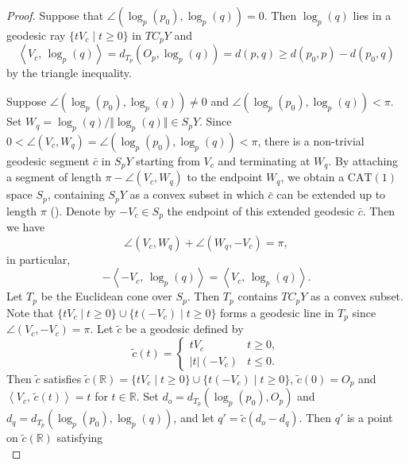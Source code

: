 \documentclass[12pt]{amsart}
\numberwithin{equation}{section}
\theoremstyle{plain}
\theoremstyle{definition}
\theoremstyle{remark}
\newcommand{\R}{{\mathbb R}}
\newcommand{\tcprj}{\log}
\newcommand{\inner}[2]{\left\langle #1,\, #2 \right\rangle}
\newcommand{\cat}[1]{\mathrm{CAT}(#1)}
\begin{document}
\begin{proof}
 Suppose that $\angle (\tcprj_p(p_0),\tcprj_p(q))=0$. 
 Then $\tcprj_p(q)$ lies in a geodesic ray $\{tV_c\mid t\geq 0\}$ in
 $TC_pY$ and 
 \begin{equation*}
   \inner{V_c}{\tcprj_p(q)} = d_{T_p}(O_p,\tcprj_p(q))
   = d(p,q) \geq d(p_0,p)-d(p_0,q)
 \end{equation*}
 by the triangle inequality.  

 Suppose $\angle (\tcprj_p(p_0),\tcprj_p(q))\not=0$ and 
 $\angle (\tcprj_p(p_0),\tcprj_p(q))< \pi$. 
 Set  $W_q = \tcprj_p(q)/\Vert \tcprj_p(q) \Vert \in S_pY$. 
 Since $0< \angle (V_c, W_q) =\angle (\tcprj_p(p_0),\tcprj_p(q)) < \pi$, 
 there is a non-trivial geodesic segment $\bar c$ in $S_pY$ starting
 from $V_c$ and terminating at $W_q$.
 By attaching a segment of length $\pi-\angle (V_c, W_q)$ to the
 endpoint $W_q$, we obtain a $\cat{1}$ space $S_p$, containing
 $S_pY$ as a convex subset in which $\bar c$ can be extended up to
 length $\pi$
 (\cite[p.~347, 11.1 Basic Glueing Theorem]{bridson-haefliger}). 
  Denote by $-V_c \in S_p$ the endpoint of this extended
 geodesic $\bar c$.  Then we have
 \begin{equation*}
  \angle(V_c, W_q) + \angle(W_q,-V_c) = \pi, 
 \end{equation*}
 in particular, 
 \begin{equation}
 \label{eq:minus_vector}
  -\inner{-V_c}{\tcprj_p(q)} %
  = \inner{V_c}{\tcprj_p(q)}. 
 \end{equation}
 Let $T_p$ be the Euclidean cone over $S_p$.  
 Then $T_p$ contains $TC_pY$ as a convex subset. 
 Note that $\{tV_c\mid t\geq 0\} \cup \{t(-V_c) \mid t\geq 0\}$
 forms a geodesic line in $T_p$ since $\angle(V_c,-V_c)=\pi$. 
 Let $\tilde c$ be a geodesic defined by
\begin{equation*}
 \tilde c (t)=
 \begin{cases}
  tV_c & t\geq 0, \\
  \vert t \vert (-V_c) & t \leq 0. 
 \end{cases}
\end{equation*}
 Then $\tilde c$ satisfies
 $\tilde c(\R) = \{tV_c\mid t\geq 0\} \cup \{t(-V_c) \mid t\geq 0\}$, 
 $\tilde c(0)=O_p$ and $\inner{V_c}{\tilde c(t)} = t$ for
 $t \in \R$. 
 Set $d_o=d_{T_p}(\tcprj_p(p_0),O_p)$ and 
 $d_q=d_{T_p}(\tcprj_p(p_0),\tcprj_p(q))$, and let
 $q'=\tilde c(d_o-d_q)$. 
 Then $q'$ is a point on $\tilde c(\R)$ satisfying
 \begin{equation*}

\end{equation*}
\end{proof}
\end{document}
